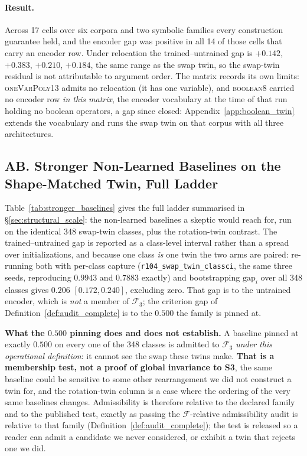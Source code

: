 \paragraph{Result.} Across 17 cells over six corpora and two symbolic families every construction guarantee held, and the encoder gap was positive in all 14 of those cells that carry an encoder row. Under relocation the trained--untrained gap is $+0.142$, $+0.383$, $+0.210$, $+0.184$, the same range as the swap twin, so the swap-twin residual is not attributable to argument order. The matrix records its own limits: \textsc{oneVarPoly13} admits no relocation (it has one variable), and \textsc{boolean8} carried no encoder row \emph{in this matrix}, the encoder vocabulary at the time of that run holding no boolean operators, a gap since closed: Appendix~\ref{app:boolean_twin} extends the vocabulary and runs the swap twin on that corpus with all three architectures.

\subsection*{AB. Stronger Non-Learned Baselines on the Shape-Matched Twin, Full Ladder}

Table~\ref{tab:stronger_baselines} gives the full ladder summarised in \S\ref{sec:structural_scale}: the non-learned baselines a skeptic would reach for, run on the identical 348 swap-twin classes, plus the rotation-twin contrast. The trained--untrained gap is reported as a class-level interval rather than a spread over initializations, and because one class \emph{is} one twin the two arms are paired: re-running both with per-class capture (\texttt{r104\_swap\_twin\_classci}, the same three seeds, reproducing $0.9943$ and $0.7883$ exactly) and bootstrapping $\mathrm{gap}_i$ over all 348 classes gives $0.206$ $[0.172,0.240]$, excluding zero. That gap is to the untrained encoder, which is \emph{not} a member of $\mathcal{F}_3$; the criterion gap of Definition~\ref{def:audit_complete} is to the $0.500$ the family is pinned at.

\noindent\textbf{What the $0.500$ pinning does and does not establish.} A baseline pinned at exactly $0.500$ on every one of the 348 classes is admitted to $\mathcal{F}_3$ \emph{under this operational definition}: it cannot see the swap these twins make. \textbf{That is a membership test, not a proof of global invariance to S3}, the same baseline could be sensitive to some other rearrangement we did not construct a twin for, and the rotation-twin column is a case where the ordering of the very same baselines changes. Admissibility is therefore relative to the declared family and to the published test, exactly as passing the $\mathcal{F}$-relative admissibility audit is relative to that family (Definition~\ref{def:audit_complete}); the test is released so a reader can admit a candidate we never considered, or exhibit a twin that rejects one we did.

